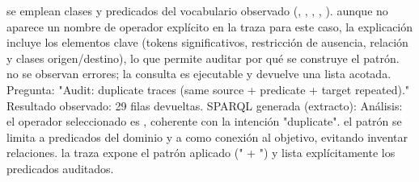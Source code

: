 \markdownRendererUlItem {} se emplean clases y predicados del vocabulario observado (, , , , ).\markdownRendererUlItemEnd 
\markdownRendererUlItem {} aunque no aparece un nombre de operador explícito en la traza para este caso, la explicación incluye los elementos clave (tokens significativos, restricción de ausencia, relación y clases origen/destino), lo que permite auditar por qué se construye el patrón.\markdownRendererUlItemEnd 
\markdownRendererUlItem {} no se observan errores; la consulta es ejecutable y devuelve una lista acotada.\markdownRendererUlItemEnd 
\markdownRendererUlEndTight \markdownRendererInterblockSeparator
{}\markdownRendererInterblockSeparator
{}Pregunta: "Audit: duplicate traces (same source + predicate + target repeated)."\markdownRendererInterblockSeparator
{}Resultado observado: 29 filas devueltas.\markdownRendererInterblockSeparator
{}SPARQL generada (extracto):\markdownRendererInterblockSeparator
{}\markdownRendererInterblockSeparator
{}Análisis:\markdownRendererInterblockSeparator
{}\markdownRendererUlBeginTight
\markdownRendererUlItem {} el operador seleccionado es , coherente con la intención "duplicate".\markdownRendererUlItemEnd 
\markdownRendererUlItem {} el patrón se limita a predicados del dominio y a  como conexión al objetivo, evitando inventar relaciones.\markdownRendererUlItemEnd 
\markdownRendererUlItem {} la traza expone el patrón aplicado (" + ") y lista explícitamente los predicados auditados.\markdownRendererUlItemEnd 
